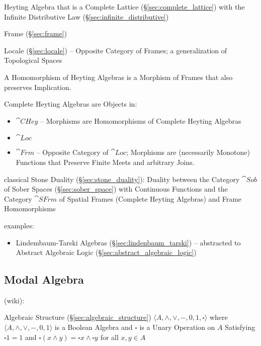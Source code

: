 Heyting Algebra that is a Complete Lattice
(\S\ref{sec:complete_lattice}) with the Infinite Distributive Law
(\S\ref{sec:infinite_distributive})

Frame (\S\ref{sec:frame})

Locale (\S\ref{sec:locale}) -- Opposite Category of Frames; a generalization of
Topological Spaces

A Homomorphism of Heyting Algebras is a Morphism of Frames that also
preserves Implication.

Complete Heyting Algebras are Objects in:
\begin{itemize}
  \item $\cat{CHey}$ -- Morphisms are Homomorphisms of Complete
    Heyting Algebras
  \item $\cat{Loc}$
  \item $\cat{Frm}$ -- Opposite Category of $\cat{Loc}$; Morphisms are
    (necessarily Monotone) Functions that Preserve Finite Meets and
    arbitrary Joins.
\end{itemize}

classical Stone Duality (\S\ref{sec:stone_duality}): Duality between the
Category $\cat{Sob}$ of Sober Spaces (\S\ref{sec:sober_space}) with Continuous
Functions and the Category $\cat{SFrm}$ of Spatial Frames (Complete Heyting
Algebras) and Frame Homomorphisms

examples:
\begin{itemize}
  \item Lindembaum-Tarski Algebras (\S\ref{sec:lindenbaum_tarski}) -- abstracted
    to Abstract Algebraic Logic (\S\ref{sec:abstract_algebraic_logic})
\end{itemize}



\subsection{Modal Algebra}\label{sec:modal_algebra}

(wiki):

Algebraic Structure (\S\ref{sec:algebraic_structure}) $\langle{A, \wedge, \vee,
  -, 0, 1, \square}\rangle$ where $\langle{A, \wedge, \vee, -, 0, 1}\rangle$ is
a Boolean Algebra and $\square$ is a Unary Operation on $A$ Satisfying
$\square{1} = 1$ and $\square(x \wedge y) = \square x \wedge \square y$ for all
$x, y \in A$

